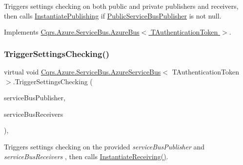 Triggers settings checking on both public and private publishers and receivers, then calls \hyperlink{classCqrs_1_1Azure_1_1ServiceBus_1_1AzureServiceBus_a5c286d29b0bbfe3770f3407efda57036_a5c286d29b0bbfe3770f3407efda57036}{Instantiate\+Publishing} if \hyperlink{classCqrs_1_1Azure_1_1ServiceBus_1_1AzureServiceBus_a17195f3c8e05ec37dfac37a8e9e1b089_a17195f3c8e05ec37dfac37a8e9e1b089}{Public\+Service\+Bus\+Publisher} is not null. 



Implements \hyperlink{classCqrs_1_1Azure_1_1ServiceBus_1_1AzureBus_ae501f84c4983bfa3b2ae4551749ac998_ae501f84c4983bfa3b2ae4551749ac998}{Cqrs.\+Azure.\+Service\+Bus.\+Azure\+Bus$<$ T\+Authentication\+Token $>$}.

\mbox{\label{classCqrs_1_1Azure_1_1ServiceBus_1_1AzureServiceBus_a31ea4f3f8f5acea0225909611097297e_a31ea4f3f8f5acea0225909611097297e}} 
\subsubsection{\texorpdfstring{Trigger\+Settings\+Checking()}{TriggerSettingsChecking()}\hspace{0.1cm}{\footnotesize\ttfamily [2/2]}}
{\footnotesize\ttfamily virtual void \hyperlink{classCqrs_1_1Azure_1_1ServiceBus_1_1AzureServiceBus}{Cqrs.\+Azure.\+Service\+Bus.\+Azure\+Service\+Bus}$<$ T\+Authentication\+Token $>$.Trigger\+Settings\+Checking (\begin{DoxyParamCaption}\item[{Topic\+Client}]{service\+Bus\+Publisher,  }\item[{I\+Dictionary$<$ int, Subscription\+Client $>$}]{service\+Bus\+Receivers }\end{DoxyParamCaption})\hspace{0.3cm}{\ttfamily [protected]}, {\ttfamily [virtual]}}



Triggers settings checking on the provided {\itshape service\+Bus\+Publisher}  and {\itshape service\+Bus\+Receivers} , then calls \hyperlink{classCqrs_1_1Azure_1_1ServiceBus_1_1AzureServiceBus_ad49a2d063279ec98443e7f1d69178cfa_ad49a2d063279ec98443e7f1d69178cfa}{Instantiate\+Receiving()}. 



